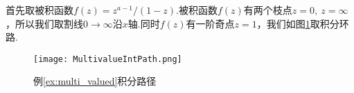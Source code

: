         \begin{solution}
            首先取被积函数$f(z)=z^{a-1}/(1-z)$.被积函数$f(z)$有两个枝点$z=0,\ z=\infty$，所以我们取割线$0\to\infty$沿$x$轴.同时$f(z)$有一阶奇点$z=1$，我们如图\ref{fig:MultivalueIntPath}取积分环路.
        \end{solution}
        \begin{figure}
            \centering
            \texttt{[image: MultivalueIntPath.png]}
            \caption{例\ref{ex:multi_valued}积分路径}
            \label{fig:MultivalueIntPath}
        \end{figure}
        